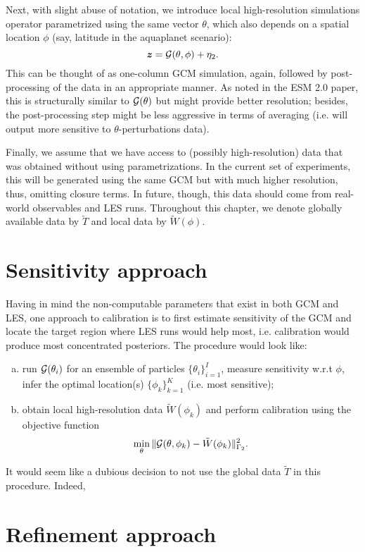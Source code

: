 \documentclass{report}
\begin{document}
Next, with slight abuse of notation, we introduce local high-resolution simulations operator parametrized using the same vector $\theta$, which also depends on a spatial location $\phi$ (say, latitude in the aquaplanet scenario):
\[
  \bm{z} = \mathcal{G}(\theta, \phi) + \eta_2.
\]
This can be thought of as one-column GCM simulation, again, followed by post-processing of the data in an appropriate manner.
As noted in the ESM 2.0 paper, this is structurally similar to $\mathcal{G}(\theta)$ but might provide better resolution; besides, the post-processing step might be less aggressive in terms of averaging (i.e. will output more sensitive to $\theta$-perturbations data).

Finally, we assume that we have access to (possibly high-resolution) data that was obtained without using parametrizations.
In the current set of experiments, this will be generated using the same GCM but with much higher resolution, thus, omitting closure terms.
In future, though, this data should come from real-world observables and LES runs.
Throughout this chapter, we denote globally available data by $\tilde{T}$ and local data by $\tilde{W}(\phi)$.

\section{Sensitivity approach}

Having in mind the non-computable parameters that exist in both GCM and LES, one approach to calibration is to first estimate sensitivity of the GCM and locate the target region where LES runs would help most, i.e. calibration would produce most concentrated posteriors.
The procedure would look like:
\begin{enumerate}[(a)]
  \item run $\mathcal{G}(\theta_i)$ for an ensemble of particles $\{ \theta_i \}_{i=1}^I$, measure sensitivity w.r.t $\phi$, infer the optimal location(s) $\{ \phi_k \}_{k=1}^K$ (i.e. most sensitive);
  \item obtain local high-resolution data $\tilde{W}(\phi_k)$ and perform calibration using the objective function
    \[
      \min_\theta \| \mathcal{G}(\theta, \phi_k) - \tilde{W}(\phi_k) \|_{\Gamma_2}^2.
    \]
\end{enumerate}

It would seem like a dubious decision to not use the global data $\tilde{T}$ in this procedure.
Indeed, 

\section{Refinement approach}
\end{document}

